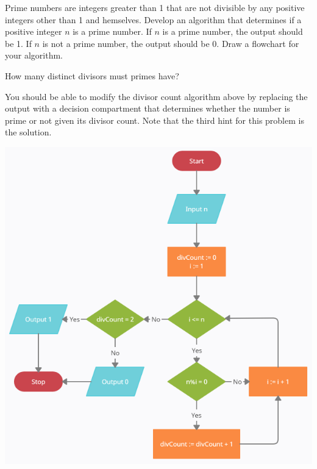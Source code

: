 \documentclass{ximera}
\begin{document}
\begin{question}
	 Prime numbers are integers greater than 1 that are not divisible by any positive integers other than 1 and hemselves. Develop an algorithm that determines if a positive integer $n$ is a prime number. If $n$ is a prime number, the output should be 1. If $n$ is not a prime number, the output should be 0. Draw a flowchart for your algorithm.
	\begin{hint}
		How many distinct divisors must primes have?
	\end{hint}
	\begin{hint}
		You should be able to modify the divisor count algorithm above by replacing the output with a decision compartment that determines whether the number is prime or not given its divisor count. Note that the third hint for this problem is the solution.
	\end{hint}
	\begin{hint}
		\begin{center}
			\includegraphics{primes.png}
		\end{center}
	\end{hint}
\end{question}
\end{document}
